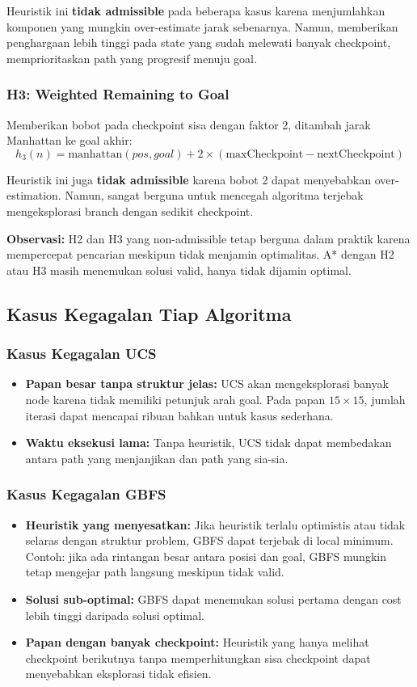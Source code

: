 Heuristik ini \textbf{tidak admissible} pada beberapa kasus karena menjumlahkan komponen yang mungkin over-estimate jarak sebenarnya. Namun, memberikan penghargaan lebih tinggi pada state yang sudah melewati banyak checkpoint, memprioritaskan path yang progresif menuju goal.

\subsubsection{H3: Weighted Remaining to Goal}
Memberikan bobot pada checkpoint sisa dengan faktor 2, ditambah jarak Manhattan ke goal akhir:
$$h_3(n) = \text{manhattan}(pos, goal) + 2 \times (\text{maxCheckpoint} - \text{nextCheckpoint})$$

Heuristik ini juga \textbf{tidak admissible} karena bobot 2 dapat menyebabkan over-estimation. Namun, sangat berguna untuk mencegah algoritma terjebak mengeksplorasi branch dengan sedikit checkpoint.

\textbf{Observasi:} H2 dan H3 yang non-admissible tetap berguna dalam praktik karena mempercepat pencarian meskipun tidak menjamin optimalitas. A* dengan H2 atau H3 masih menemukan solusi valid, hanya tidak dijamin optimal.

\subsection{Kasus Kegagalan Tiap Algoritma}

\subsubsection{Kasus Kegagalan UCS}
\begin{itemize}
    \item \textbf{Papan besar tanpa struktur jelas:} UCS akan mengeksplorasi banyak node karena tidak memiliki petunjuk arah goal. Pada papan $15 \times 15$, jumlah iterasi dapat mencapai ribuan bahkan untuk kasus sederhana.
    \item \textbf{Waktu eksekusi lama:} Tanpa heuristik, UCS tidak dapat membedakan antara path yang menjanjikan dan path yang sia-sia.
\end{itemize}

\subsubsection{Kasus Kegagalan GBFS}
\begin{itemize}
    \item \textbf{Heuristik yang menyesatkan:} Jika heuristik terlalu optimistis atau tidak selaras dengan struktur problem, GBFS dapat terjebak di local minimum. Contoh: jika ada rintangan besar antara posisi dan goal, GBFS mungkin tetap mengejar path langsung meskipun tidak valid.
    \item \textbf{Solusi sub-optimal:} GBFS dapat menemukan solusi pertama dengan cost lebih tinggi daripada solusi optimal.
    \item \textbf{Papan dengan banyak checkpoint:} Heuristik yang hanya melihat checkpoint berikutnya tanpa memperhitungkan sisa checkpoint dapat menyebabkan eksplorasi tidak efisien.
\end{itemize}

